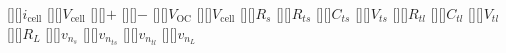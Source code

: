[][]{$i_\text{cell}$}
[][]{$V_\text{cell}$}
\psfrag{+}[][]{$+$}
\psfrag{-}[][]{$-$}
[][]{$V_\text{OC}$}
[][]{$V_\text{cell}$}
[][]{$R_s$}
[][]{$R_{ts}$}
[][]{$C_{ts}$}
[][]{$V_{ts}$}
[][]{$R_{tl}$}
[][]{$C_{tl}$}
[][]{$V_{tl}$}
[][]{$R_L$}
[][]{$v_{n_s}$}
[][]{$v_{n_{ts}}$}
[][]{$v_{n_{tl}}$}
[][]{$v_{n_L}$}

\centering
